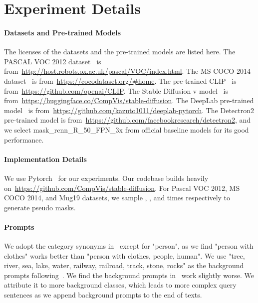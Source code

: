 \documentclass[letterpaper]{article} \usepackage[submission]{aaai24}  \usepackage{times}  \usepackage{helvet}  \usepackage{courier}  \usepackage[hyphens]{url}  \usepackage{graphicx} \urlstyle{rm} \def\UrlFont{\rm}  \usepackage{natbib}  \usepackage{caption} \frenchspacing  \setlength{\pdfpagewidth}{8.5in} \setlength{\pdfpageheight}{11in} \usepackage{algorithm}
\begin{document}
\appendix

\section{Experiment Details}

\paragraph{Datasets and Pre-trained Models}

The licenses of the datasets and the pre-trained models are listed here.
The PASCAL VOC 2012 dataset~\cite{pascalvoc} is from~\url{http://host.robots.ox.ac.uk/pascal/VOC/index.html}.
The MS COCO 2014 dataset~\cite{mscoco} is from~\url{https://cocodataset.org/#home}.
The pre-trained CLIP~\cite{clip} is from~\url{https://github.com/openai/CLIP}.
The Stable Diffusion v model~\cite{stablediffusion} is from~\url{https://huggingface.co/CompVis/stable-diffusion}.
The DeepLab pre-trained model~\cite{DeepLab} is from~\url{https://github.com/kazuto1011/deeplab-pytorch}.
The Detectron2 pre-trained model is from~\url{https://github.com/facebookresearch/detectron2}, and we select mask\_rcnn\_R\_50\_FPN\_3x from official baseline models for its good performance.

\paragraph{Implementation Details}

We use Pytorch~\cite{pytorch} for our experiments. 
Our codebase builds heavily on~\url{https://github.com/CompVis/stable-diffusion}.
For Pascal VOC 2012, MS COCO 2014, and Mug19 datasets, we sample , , and  times respectively to generate pseudo masks.

\paragraph{Prompts}

We adopt the category synonyms in~\cite{CLIP-ES} except for "person", as we find "person with clothes" works better than "person with clothes, people, human".
We use "tree, river, sea, lake, water, railway, railroad, track, stone, rocks" as the background prompts following~\cite{clims}.
We find the background prompts in~\cite{CLIP-ES} work slightly worse.
We attribute it to more background classes, which leads to more complex query sentences as we append background prompts to the end of texts.
\end{document}
